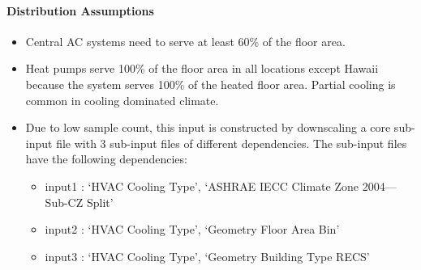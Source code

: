 \paragraph{Distribution Assumptions}
% 
\begin{itemize}
    \item Central AC systems need to serve at least 60\% of the floor area.
    \item Heat pumps serve 100\% of the floor area in all locations except Hawaii because the system serves 100\% of the heated floor area. Partial cooling is common in cooling dominated climate.
    \item Due to low sample count, this input is constructed by downscaling a core sub-input file with 3 sub-input files of different dependencies. The sub-input files have the following dependencies: 
    \begin{itemize}
        \item input1 : ‘HVAC Cooling Type’, ‘ASHRAE IECC Climate Zone 2004---Sub-CZ Split’
        \item input2 : ‘HVAC Cooling Type’, ‘Geometry Floor Area Bin’
        \item input3 : ‘HVAC Cooling Type’, ‘Geometry Building Type RECS’
    \end{itemize}
\end{itemize}
